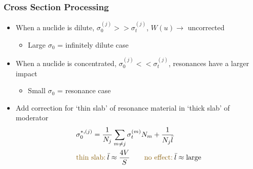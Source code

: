 \documentclass[xcolor=x11names,compress]{beamer}
\renewcommand{\(}{\begin{columns}}
\renewcommand{\)}{\end{columns}}
\newcommand{\<}[1]{\begin{column}{#1}}
\renewcommand{\>}{\end{column}}
\begin{document}
\begin{frame}[fragile]
  \frametitle{Cross Section Processing}

	\begin{itemize}
	\item When a nuclide is dilute, $\sigma_0^{(j)} >>
	 \sigma_t^{(j)}$, $W(u) \rightarrow$ uncorrected 
		\begin{itemize}
		\item Large $\sigma_0$ = infinitely dilute case	
		\end{itemize}

	\item When a nuclide is concentrated, $\sigma_0^{(j)} << 
	 \sigma_t^{(j)}$, resonances have a larger impact 
		\begin{itemize}
		\item Small $\sigma_0$ = resonance case	
		\end{itemize}
	\end{itemize}
	
	\begin{itemize}
	\item Add correction for `thin slab' of resonance material in 
	`thick slab' of moderator
	\begin{align}
  	&\sigma_0^{*,(j)} = \frac{1}{N_j} \sum_{m \ne j} \sigma_{t}^{(m)} N_m 
	+ \frac{1}{N_j \bar{l}} \\
  	&\text{\textcolor{byellow}{thin slab:}}\:\bar{l} \approx \frac{4V}{S} \qquad \text{\textcolor{byellow}{no effect:}}\:\bar{l} \approx \text{large} \nonumber
	\end{align}
	\end{itemize}
  
\end{frame}
\end{document}
